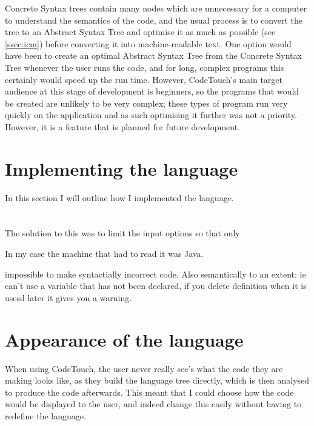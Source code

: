 \documentclass[ %
                    author={Jonathan Rankin},
                supervisor={Dr. David May, Dr. Ian Holyer},
                    degree={MEng},
                     title={CodeTouch},
                  subtitle={A Revolutionary Way To Program Real Code On Touch Screen Devices},
                      type={enterprise},
                      year={2015 } ]{dissertation}
\begin{document}
Concrete Syntax trees contain many nodes which are unnecessary for a computer to understand the semantics of the code, and the usual process is to convert the tree to an Abstract Syntax Tree and optimise it as much as possible (see \ref{ssec:icm}) before converting it into machine-readable text. One option would have been to create an optimal Abstract Syntax Tree from the Concrete Syntax Tree whenever the user runs the code, and for long, complex programs this certainly would speed up the run time. However, CodeTouch's main target audience at this stage of development is beginners, so the programs that would be created are unlikely to be very complex; these types of program run very quickly on the application and as such optimising it further was not a priority. However, it is a feature that is planned for future development. 


\section{Implementing the language}
 In this section I will outline how I implemented the language. 
 
 \section{}

The solution to this was to limit the input options so that only 

In my case the machine that had to read it was Java.

impossible to make syntactially incorrect code. Also semantically to an extent: ie can't use a variable that has not been declared, if you delete definition when it is usesd later it gives you a warning. 



\section{Appearance of the language}
When using CodeTouch, the user never really see's what the code they are making looks like, as they build the language tree directly, which is then analysed to produce the code afterwards. This meant that I could choose how the code would be displayed to the user, and indeed change this easily without having to redefine the language. 
\end{document}
